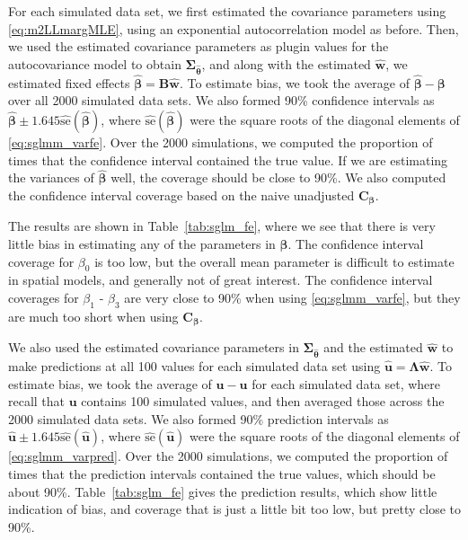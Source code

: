 \documentclass[12pt, titlepage]{article}
\begin{document}
For each simulated data set, we first estimated the covariance parameters using \eqref{eq:m2LLmargMLE}, using an exponential autocorrelation model as before. Then, we used the estimated covariance parameters as plugin values for the autocovariance model to obtain $\boldsymbol{\Sigma}_{\hat{\boldsymbol{\theta}}}$, and along with the estimated $\hat{\mathbf{w}}$, we estimated fixed effects $\hat{\boldsymbol{\beta}} = \mathbf{B}\hat{\mathbf{w}}$.  To estimate bias, we took the average of $\hat{\boldsymbol{\beta}} - \boldsymbol{\beta}$ over all 2000 simulated data sets. We also formed 90\% confidence intervals as $\hat{\boldsymbol{\beta}} \pm 1.645 \widehat{\textrm{se}}(\hat{\boldsymbol{\beta}})$, where $\widehat{\textrm{se}}(\hat{\boldsymbol{\beta}})$ were the square roots of the diagonal elements of \eqref{eq:sglmm_varfe}.  Over the 2000 simulations, we computed the proportion of times that the confidence interval contained the true value.  If we are estimating the variances of $\hat{\boldsymbol{\beta}}$ well, the coverage should be close to 90\%. We also computed the confidence interval coverage based on the naive unadjusted $\mathbf{C}_{\boldsymbol{\beta}}$. 

The results are shown in Table~\ref{tab:sglm_fe}, where we see that there is very little bias in estimating any of the parameters in $\boldsymbol{\beta}$.  The confidence interval coverage for $\beta_{0}$ is too low, but the overall mean parameter is difficult to estimate in spatial models, and generally not of great interest.  The confidence interval coverages for $\beta_{1}$ - $\beta_{3}$ are very close to 90\% when using \eqref{eq:sglmm_varfe}, but they are much too short when using $\mathbf{C}_{\boldsymbol{\beta}}$.

We also used the estimated covariance parameters in $\boldsymbol{\Sigma}_{\hat{\boldsymbol{\theta}}}$ and the estimated $\hat{\mathbf{w}}$ to make predictions at all 100 values for each simulated data set using $\hat{\mathbf{u}} = \boldsymbol{\Lambda}\hat{\mathbf{w}}$.  To estimate bias, we took the average of $\hat{\mathbf{u}} - \mathbf{u}$ for each simulated data set, where recall that $\mathbf{u}$ contains 100 simulated values, and then averaged those across the 2000 simulated data sets.  We also formed 90\% prediction intervals as $\hat{\mathbf{u}} \pm 1.645 \widehat{\textrm{se}}(\hat{\mathbf{u}})$, where $\widehat{\textrm{se}}(\hat{\mathbf{u}})$ were the square roots of the diagonal elements of \eqref{eq:sglmm_varpred}. Over the 2000 simulations, we computed the proportion of times that the prediction intervals contained the true values, which should be about 90\%. Table~\ref{tab:sglm_fe} gives the prediction results, which show little indication of bias, and coverage that is just a little bit too low, but pretty close to 90\%.
\end{document}
